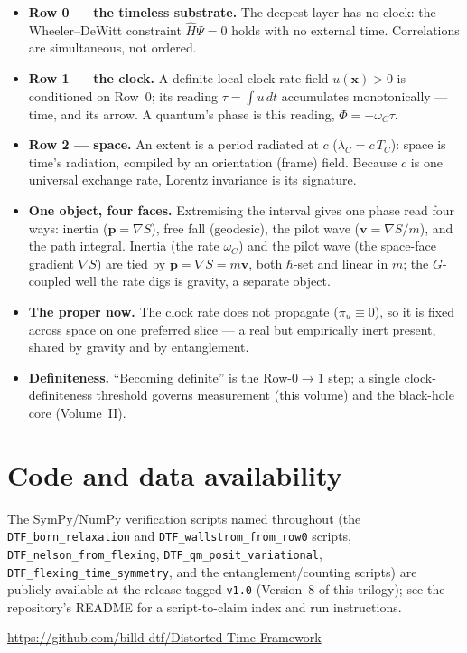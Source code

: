 \documentclass[11pt]{article}
\begin{document}
\begin{itemize}[leftmargin=1.4em,itemsep=3pt,topsep=3pt]
  \item \textbf{Row 0 --- the timeless substrate.} The deepest layer has no clock: the Wheeler--DeWitt
    constraint $\hat H\Psi=0$ holds with no external time. Correlations are simultaneous, not ordered.
  \item \textbf{Row 1 --- the clock.} A definite local clock-rate field $u(\mathbf x)>0$ is conditioned
    on Row~0; its reading $\tau=\int u\,dt$ accumulates monotonically --- time, and its arrow. A
    quantum's phase is this reading, $\Phi=-\omega_C\tau$.
  \item \textbf{Row 2 --- space.} An extent is a period radiated at $c$ ($\lambda_C=c\,T_C$): space is
    time's radiation, compiled by an orientation (frame) field. Because $c$ is one universal exchange
    rate, Lorentz invariance is its signature.
  \item \textbf{One object, four faces.} Extremising the interval gives one phase read four ways: inertia
    ($\mathbf p=\nabla S$), free fall (geodesic), the pilot wave ($\mathbf v=\nabla S/m$), and the path
    integral. Inertia (the rate $\omega_C$) and the pilot wave (the space-face gradient $\nabla S$) are
    tied by $\mathbf p=\nabla S=m\mathbf v$, both $\hbar$-set and linear in $m$; the $G$-coupled well the
    rate digs is gravity, a separate object.
  \item \textbf{The proper now.} The clock rate does not propagate ($\pi_u\equiv0$), so it is fixed
    across space on one preferred slice --- a real but empirically inert present, shared by gravity and
    by entanglement.
  \item \textbf{Definiteness.} ``Becoming definite'' is the Row-0$\to$1 step; a single
    clock-definiteness threshold governs measurement (this volume) and the black-hole core (Volume~II).
\end{itemize}

\section*{Code and data availability}
{\small The SymPy/NumPy verification scripts named throughout (the \texttt{DTF\_born\_relaxation} and
\texttt{DTF\_wallstrom\_from\_row0} scripts, \texttt{DTF\_nelson\_from\_flexing},
\texttt{DTF\_qm\_posit\_variational}, \texttt{DTF\_flexing\_time\_symmetry}, and the entanglement/counting
scripts) are publicly available at the release tagged \texttt{v1.0} (Version~8 of this trilogy); see the
repository's README for a script-to-claim index and run instructions.\par
\smallskip
\url{https://github.com/billd-dtf/Distorted-Time-Framework}\par}
\end{document}
